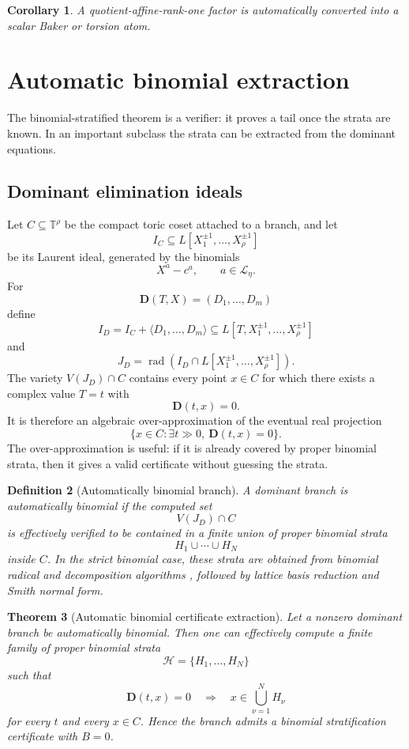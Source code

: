 \documentclass[11pt]{article}
\newtheorem{theorem}{Theorem}[section]
\newtheorem{corollary}[theorem]{Corollary}
\newtheorem{definition}[theorem]{Definition}
\newcommand{\T}{\mathbb T}
\DeclareMathOperator{\Rad}{rad}
\begin{document}
\begin{corollary}
A quotient-affine-rank-one factor is automatically converted into a scalar Baker or torsion atom.
\end{corollary}

\section{Automatic binomial extraction}

The binomial-stratified theorem is a verifier: it proves a tail once the strata are known. In an important subclass the strata can be extracted from the dominant equations.

\subsection{Dominant elimination ideals}

Let \(C\subseteq\T^\rho\) be the compact toric coset attached to a branch, and let
\[
I_C\subseteq L[X_1^{\pm1},\ldots,X_\rho^{\pm1}]
\]
be its Laurent ideal, generated by the binomials
\[
X^a-c^a,
\qquad
a\in\mathcal L_\eta.
\]
For
\[
\mathbf D(T,X)=(D_1,\ldots,D_m)
\]
define
\[
I_D=
I_C+\langle D_1,\ldots,D_m\rangle
\subseteq
L[T,X_1^{\pm1},\ldots,X_\rho^{\pm1}]
\]
and
\[
J_D=
\Rad\left(I_D\cap L[X_1^{\pm1},\ldots,X_\rho^{\pm1}]\right).
\]
The variety \(V(J_D)\cap C\) contains every point \(x\in C\) for which there exists a complex value \(T=t\) with
\[
\mathbf D(t,x)=0.
\]
It is therefore an algebraic over-approximation of the eventual real projection
\[
\{x\in C:\exists t\gg0,\ \mathbf D(t,x)=0\}.
\]
The over-approximation is useful: if it is already covered by proper binomial strata, then it gives a valid certificate without guessing the strata.

\begin{definition}[Automatically binomial branch]
A dominant branch is automatically binomial if the computed set
\[
V(J_D)\cap C
\]
is effectively verified to be contained in a finite union of proper binomial strata
\[
H_1\cup\cdots\cup H_N
\]
inside \(C\). In the strict binomial case, these strata are obtained from binomial radical and decomposition algorithms \cite{EisenbudSturmfels}, followed by lattice basis reduction and Smith normal form.
\end{definition}

\begin{theorem}[Automatic binomial certificate extraction]
Let a nonzero dominant branch be automatically binomial. Then one can effectively compute a finite family of proper binomial strata
\[
\mathcal H=\{H_1,\ldots,H_N\}
\]
such that
\[
\mathbf D(t,x)=0
\quad\Longrightarrow\quad
x\in\bigcup_{\nu=1}^N H_\nu
\]
for every \(t\) and every \(x\in C\). Hence the branch admits a binomial stratification certificate with \(B=0\).
\end{theorem}
\end{document}
